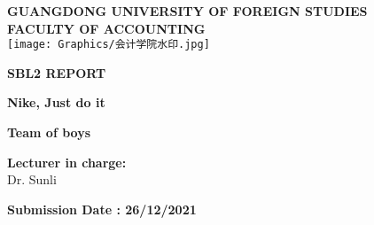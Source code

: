 \documentclass[a4paper, 12pt]{report}
\begin{document}


\begin{titlepage}
\begin{center}
\textbf{\LARGE GUANGDONG UNIVERSITY OF FOREIGN STUDIES}\\[0.5cm] 
\textbf{\large FACULTY OF ACCOUNTING}\\ [0.2cm]
\vspace{20pt}
\texttt{[image: Graphics/会计学院水印.jpg]}\\[1cm]

\par
\myrule[1pt][7pt]
\textbf{\LARGE  SBL2 REPORT}\par
\vspace{15pt}
\textbf{\large Nike,
Just do it
}\par
\myrule[1pt][7pt]
\vspace{25pt}
\textbf{\large Team of boys}\\[1cm]
\begin{comment}
\textbf{\large Student Name \hspace{20pt} Student ID}\par
1.Mengyuan Zhang \hspace{45pt} 14AGB06230 \par %
2.Haotian Xie \hspace{45pt} 14AGB06230 \par %
3.Ziyang Cai \hspace{45pt} 14AGB06230 \par
4.Xiangbo Kang \hspace{45pt} 14AGB06230 \par
5.Zifeng Dong \hspace{45pt} 14AGB06230 \par
6.Weiyao Li \hspace{45pt} 14AGB06230 \par
\end{comment}
\vspace{125pt}
\textbf {\large Lecturer in charge:}\\[0.2cm]
\Large {Dr. Sunli}\\[0.1cm]
\end{center}

\par
\vfill
\begin{center}
\textbf{Submission Date : 26/12/2021}\\
\end{center}

\end{titlepage}
\renewcommand{\contentsname}{Contents}
\renewcommand{\bibname}{Reference}
\tableofcontents 
 
\end{document}
